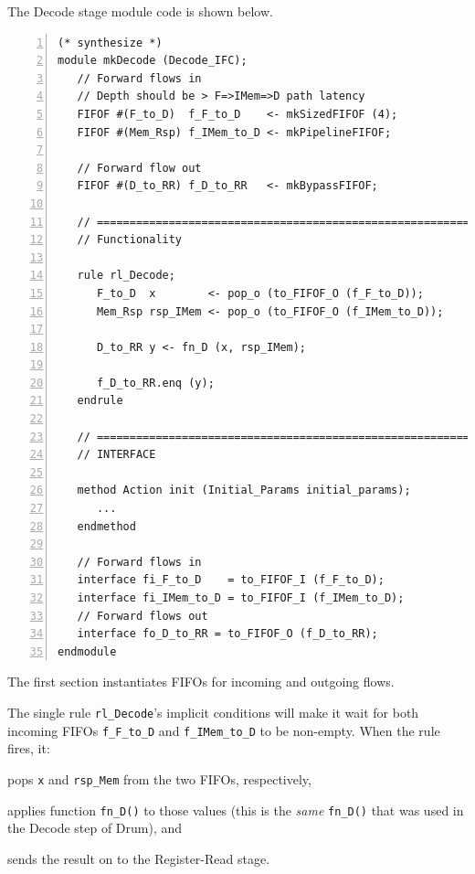 The Decode stage module code is shown below.

\label{Sec_Fife_Decode_stage}

{\small
\begin{Verbatim}[frame=single, numbers=left, label=(In file:src\_Fife/S2\_Decode.bsv)]
(* synthesize *)
module mkDecode (Decode_IFC);
   // Forward flows in
   // Depth should be > F=>IMem=>D path latency
   FIFOF #(F_to_D)  f_F_to_D    <- mkSizedFIFOF (4);
   FIFOF #(Mem_Rsp) f_IMem_to_D <- mkPipelineFIFOF;

   // Forward flow out
   FIFOF #(D_to_RR) f_D_to_RR   <- mkBypassFIFOF;

   // ================================================================
   // Functionality

   rule rl_Decode;
      F_to_D  x        <- pop_o (to_FIFOF_O (f_F_to_D));
      Mem_Rsp rsp_IMem <- pop_o (to_FIFOF_O (f_IMem_to_D));

      D_to_RR y <- fn_D (x, rsp_IMem);

      f_D_to_RR.enq (y);
   endrule

   // ================================================================
   // INTERFACE

   method Action init (Initial_Params initial_params);
      ...
   endmethod

   // Forward flows in
   interface fi_F_to_D    = to_FIFOF_I (f_F_to_D);
   interface fi_IMem_to_D = to_FIFOF_I (f_IMem_to_D);
   // Forward flows out
   interface fo_D_to_RR = to_FIFOF_O (f_D_to_RR);
endmodule
\end{Verbatim}
}

The first section instantiates FIFOs for incoming and outgoing flows.

The single rule \verb|rl_Decode|'s implicit conditions will make it
wait for both incoming FIFOs \verb|f_F_to_D| and \verb|f_IMem_to_D| to
be non-empty.  When the rule fires, it:

\begin{tightlist}
 \item pops \verb|x| and \verb|rsp_Mem| from the two FIFOs, respectively,

 \item applies function \verb|fn_D()| to those values (this is the
       \emph{same} \verb|fn_D()| that was used in the Decode step of
       Drum), and

 \item sends the result on to the Register-Read stage.
\end{tightlist}

